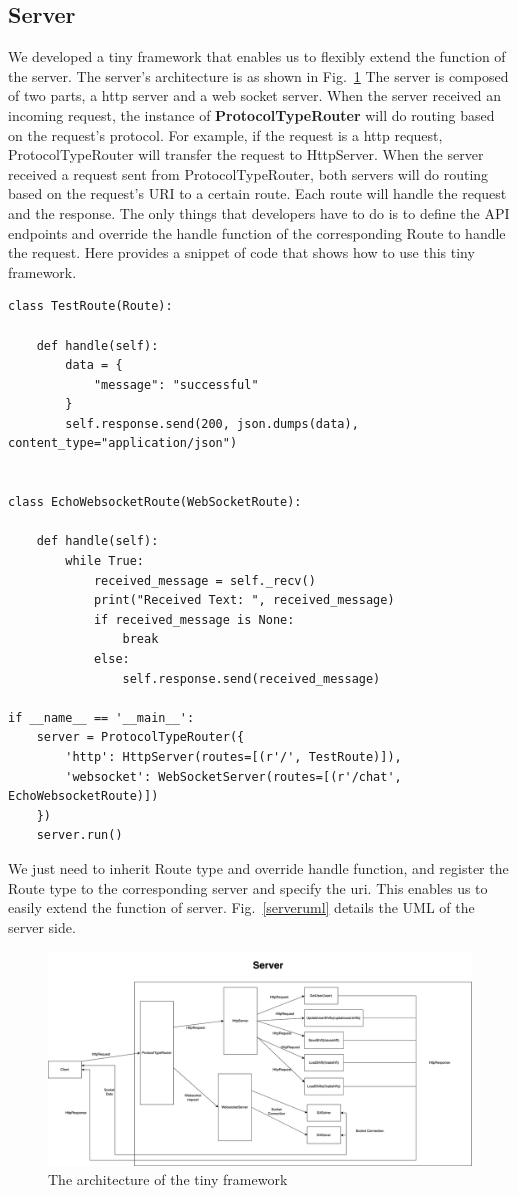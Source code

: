 \documentclass[11pt, oneside]{article}   	%
\begin{document}
\subsection{Server}
We developed a tiny framework that enables us to flexibly extend the function of the server. The server's architecture is as shown in Fig.~\ref{framework}
The server is composed of two parts, a http server and a web socket server. When the server received an incoming request, the instance of \textbf{ProtocolTypeRouter} will do routing based on the request's protocol. For example, if the request is a http request, ProtocolTypeRouter will transfer the request to HttpServer. When the server received a request sent from ProtocolTypeRouter, both servers will do routing based on the request's URI to a certain route. Each route will handle the request and the response. The only things that developers have to do is to define the API endpoints and override the handle function of the corresponding Route to handle the request.
Here provides a snippet of code that shows how to use this tiny framework.
\begin{verbatim}
class TestRoute(Route):

    def handle(self):
        data = {
            "message": "successful"
        }
        self.response.send(200, json.dumps(data), content_type="application/json")


class EchoWebsocketRoute(WebSocketRoute):

    def handle(self):
        while True:
            received_message = self._recv()
            print("Received Text: ", received_message)
            if received_message is None:
                break
            else:
                self.response.send(received_message)
                
if __name__ == '__main__':
    server = ProtocolTypeRouter({
        'http': HttpServer(routes=[(r'/', TestRoute)]),
        'websocket': WebSocketServer(routes=[(r'/chat', EchoWebsocketRoute)])
    })
    server.run()
\end{verbatim}
We just need to inherit Route type and override handle function, and  register the Route type to the corresponding server and specify the uri.
This enables us to easily extend the function of server. Fig.~\ref{serveruml} details the UML of the server side.

\begin{figure}[h]
\centering
\includegraphics[width=\textwidth]{framework}
\caption{The architecture of the tiny framework}
\label{framework}
\end{figure}
\end{document}
